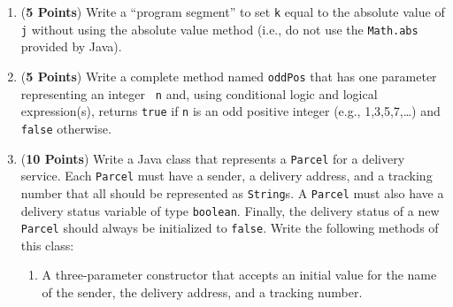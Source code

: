 \documentclass[12pt]{article}
\begin{document}
\begin{enumerate}

  \item ({\bf 5 Points}) Write a ``program segment'' to set {\tt k} equal to the absolute value of {\tt j} without using
    the absolute value method (i.e., do not use the {\tt Math.abs} provided by Java).

    \vspace*{4in}



  \item ({\bf 5 Points}) Write a complete method named {\tt oddPos} that has one parameter representing an integer {\tt
      n} and, using conditional logic and logical expression(s), returns {\tt true} if {\tt n} is an odd positive
    integer (e.g., 1,3,5,7,\ldots) and {\tt false} otherwise.

    \vspace*{2in}


    \newpage

  \item ({\bf 10 Points}) Write a Java class that represents a {\tt Parcel} for a delivery service.  Each {\tt Parcel}
    must have a sender, a delivery address, and a tracking number that all should be represented as {\tt String}s.  A
    {\tt Parcel} must also have a delivery status variable of type {\tt boolean}.  Finally, the delivery status of a new
    {\tt Parcel} should always be initialized to {\tt false}.  Write the following methods of this class:

  \begin{enumerate}

    \item A three-parameter constructor that accepts an initial value for the name of the sender, the delivery address,
      and a tracking number.


\end{enumerate}
\end{enumerate}
\end{document}
